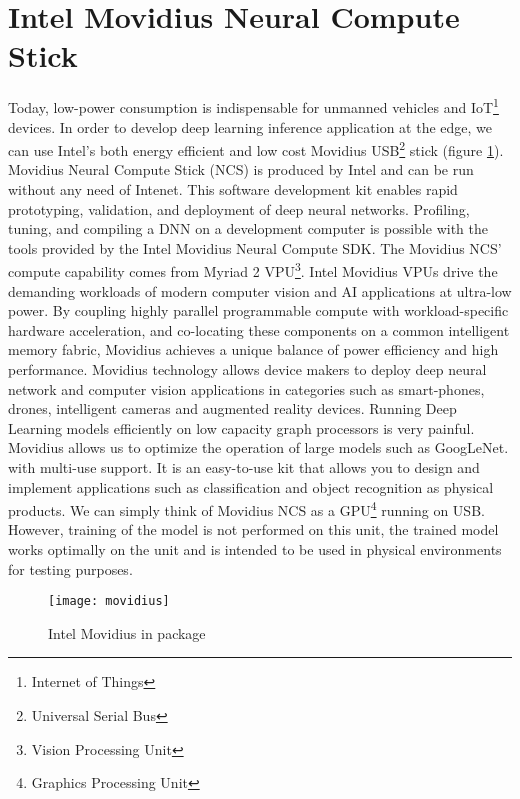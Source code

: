 \section{Intel Movidius Neural Compute Stick}
\label{sec:movidius}
Today, low-power consumption is indispensable for unmanned vehicles and 
IoT\footnote{Internet of Things} devices.
In order to develop deep learning inference application at the edge, we can use 
Intel’s both energy efficient and low cost Movidius 
USB\footnote{Universal Serial Bus} stick (figure \ref{fig:movidius}).
Movidius Neural Compute Stick (NCS) is produced by Intel and can be run 
without any need of Intenet. 
This software development kit enables rapid prototyping, validation, and 
deployment of deep neural networks. 
Profiling, tuning, and compiling a DNN on a development computer is possible 
with the tools provided by the Intel Movidius Neural Compute SDK.
The Movidius NCS’ compute capability comes from Myriad 2 VPU\footnote{Vision Processing Unit}.
Intel Movidius VPUs drive the demanding workloads of modern computer vision 
and AI applications at ultra-low power. 
By coupling highly parallel programmable compute with workload-specific hardware 
acceleration, and co-locating these components on a common intelligent memory 
fabric, Movidius achieves a unique balance of power efficiency and high performance. 
Movidius technology allows device makers to deploy deep neural network and 
computer vision applications in categories such as smart-phones, drones, 
intelligent cameras and augmented reality devices.
Running Deep Learning models efficiently on low capacity graph processors is very painful. 
Movidius allows us to optimize the operation of large models such as GoogLeNet.
with multi-use support.
It is an easy-to-use kit that allows you to design and implement applications 
such as classification and object recognition as physical products.
We can simply think of Movidius NCS as a GPU\footnote{Graphics Processing Unit} 
running on USB. 
However, training of the model is not performed on this unit, the trained model 
works optimally on the unit and is intended to be used in physical environments 
for testing purposes.
%
\begin{figure}[htb]
\centering
\texttt{[image: movidius]}
\caption{Intel Movidius in package}
\label{fig:movidius}
\end{figure}
%
